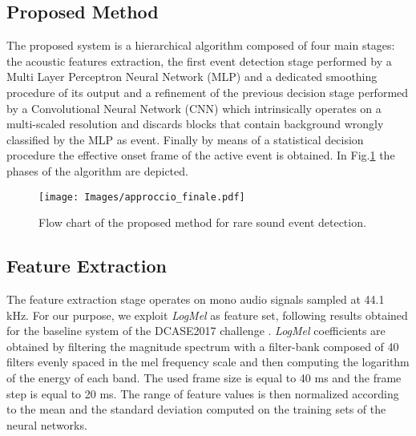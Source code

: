 \documentclass{article}
\begin{document}
\begin{sloppy}
\section{Proposed Method}
\label{sec:pagelimit}
The proposed system is a hierarchical algorithm composed of four main stages: the acoustic features extraction, the first event detection stage performed by a Multi Layer Perceptron Neural Network (MLP) and a dedicated smoothing procedure of its output and a refinement of the previous decision stage performed by a Convolutional Neural Network (CNN) which intrinsically operates on a multi-scaled resolution and discards blocks that contain background wrongly classified by the MLP as event. Finally by means of a statistical decision procedure the effective onset frame of the active event is obtained. In Fig.\ref{fig:flow-chart} the phases of the algorithm are depicted.

\begin{figure}[t]
  \centering
  \centerline{\texttt{[image: Images/approccio\_finale.pdf]}}
  \caption{Flow chart of the proposed method for rare sound event detection.}
  \label{fig:flow-chart}
\end{figure}

\subsection{Feature Extraction}
The feature extraction stage operates on mono audio signals sampled at 44.1 kHz. For our purpose, we exploit \textit{LogMel} as feature set, following results obtained for the baseline system of the DCASE2017 challenge \cite{DCASE2017challenge}. \textit{LogMel} coefficients are obtained by filtering the magnitude spectrum with a filter-bank composed of 40 filters evenly spaced in the mel frequency scale and then computing the logarithm of the energy of each band. The used frame size is equal to 40 ms and the frame step is equal to 20 ms. 
The range of feature values is then normalized according to the mean and the standard deviation computed on the training sets of the neural networks.

\end{sloppy}
\end{document}
